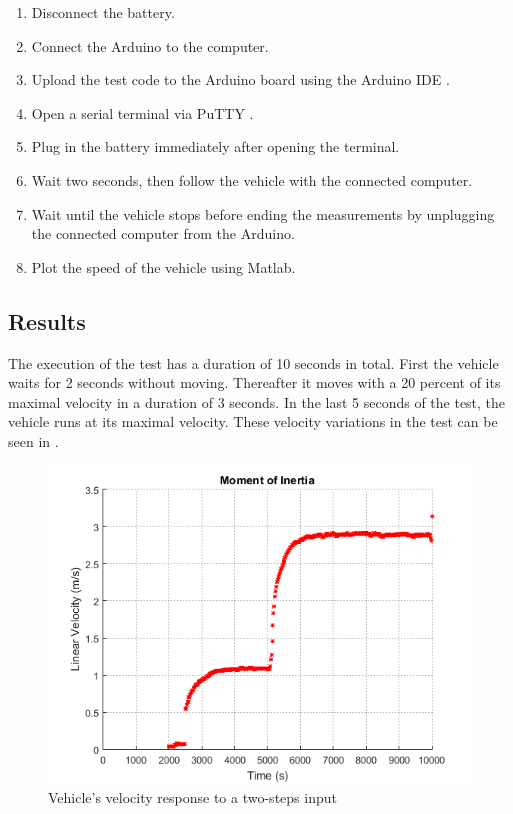 \begin{enumerate}
  \item Disconnect the battery.
  \item Connect the Arduino to the computer.
  \item Upload the test code to the Arduino board using the Arduino IDE  \cite{ArduinoIDE}.
  \item Open a serial terminal via PuTTY \cite{PuTTY}.
  \item Plug in the battery immediately after opening the terminal.
  \item Wait two seconds, then follow the vehicle with the connected computer.
  \item Wait until the vehicle stops before ending the measurements by unplugging the connected computer from the Arduino.
  \item Plot the speed of the vehicle using Matlab.
\end{enumerate}

\subsection{Results} \label{inertiaTestResults}
The execution of the test has a duration of 10 seconds in total. First the vehicle waits for 2 seconds without moving. Thereafter it moves with a 20 percent of its maximal velocity in a duration of 3 seconds. In the last 5 seconds of the test, the vehicle runs at its maximal velocity. These velocity variations in the test can be seen in .

\begin{figure}[H]
  \centering
  \includegraphics[scale=0.8]{figures/VehicleMomentOfInertiaTest.png}
  \caption{Vehicle's velocity response to a two-steps input}
  \label{fig:MomentOfInertiaTestPlot}
\end{figure}

